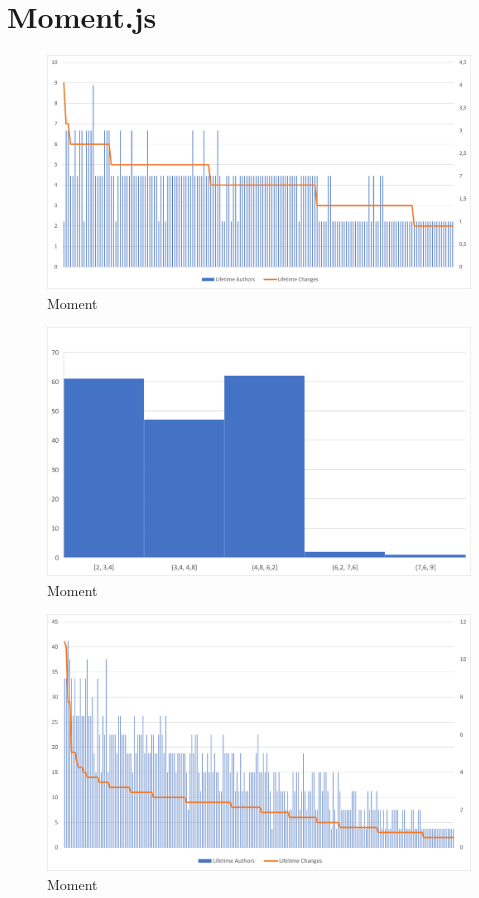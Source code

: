 \section{Moment.js}


\begin{figure}[H]
    \centering
    \includegraphics[width=1\textwidth]{images/moment/moment-2.10.5-changes.png}
    \caption{Moment}
    \label{fig:moment-2.10.5-changes}
\end{figure}

\begin{figure}[H]
    \centering
    \includegraphics[width=1\textwidth]{images/moment/moment-2.10.5-hist.png}
    \caption{Moment}
    \label{fig:moment-2.10.5-changes}
\end{figure}

\begin{figure}[H]
    \centering
    \includegraphics[width=1\textwidth]{images/moment/moment-2.20.5-changes.png}
    \caption{Moment}
    \label{fig:moment-2.10.5-changes}
\end{figure}

